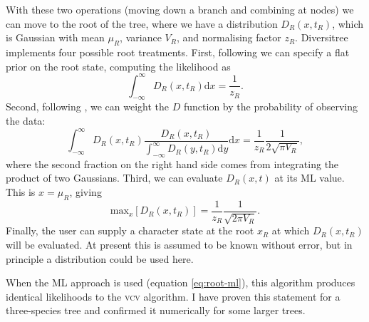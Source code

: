 \documentclass[12pt,twoside]{article}
\newcommand{\ud}{\ensuremath{\mathrm{d}}}
\begin{document}
With these two operations (moving down a branch and combining at
nodes) we can move to the root of the tree, where we have a
distribution $D_R(x,t_R)$, which is Gaussian with mean $\mu_R$,
variance $V_R$, and normalising factor $z_R$.  Diversitree implements
four possible root treatments.  First, following \citet{Pagel-1994-37}
we can specify a flat prior on the root state, computing the
likelihood as
\begin{equation}
  \label{eq:root-flat}
  \int_{-\infty}^{\infty}D_R(x,t_R)\ud x = \frac{1}{z_R}.
\end{equation}
Second, following \citet{FitzJohn-2010-619}, we can weight the $D$
function by the probability of observing the data:
\begin{equation}
  \label{eq:root-obs}
  \int_{-\infty}^{\infty}D_R(x,t_R)
  \frac{D_R(x,t_R)}{\int_{-\infty}^{\infty}D_R(y,t_R)\ud y}\ud x
  = \frac{1}{z_R} \frac{1}{2\sqrt{\pi V_R}},
\end{equation}
where the second fraction on the right hand side comes from
integrating the product of two Gaussians.  Third, we can evaluate
$D_R(x,t)$ at its ML value.  This is $x=\mu_R$, giving
\begin{equation}
  \label{eq:root-ml}
  \mathrm{max}_x[D_R(x,t_R)] = \frac{1}{z_R}\frac{1}{\sqrt{2\pi V_R}}.
\end{equation}
Finally, the user can supply a character state at the root $x_R$ at
which $D_R(x,t_R)$ will be evaluated.  At present this is assumed to
be known without error, but in principle a distribution could be used
here.

When the ML approach is used (equation \ref{eq:root-ml}), this
algorithm produces identical likelihoods to the \textsc{vcv}
algorithm.  I have proven this statement for a three-species tree and
confirmed it numerically for some larger trees.
\end{document}
